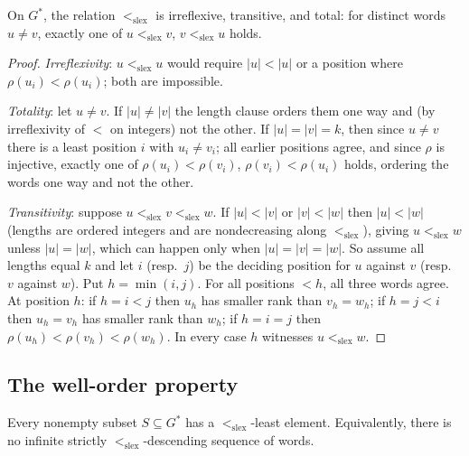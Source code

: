 \begin{proposition}\label{ch02:prop:slex-total}
On $G^{*}$, the relation $<_{\mathrm{slex}}$ is irreflexive, transitive,
and total: for distinct words $u \neq v$, exactly one of
$u <_{\mathrm{slex}} v$, $v <_{\mathrm{slex}} u$ holds.
\end{proposition}

\begin{proof}
\emph{Irreflexivity}: $u <_{\mathrm{slex}} u$ would require $|u| < |u|$ or
a position where $\rho(u_i) < \rho(u_i)$; both are impossible.

\emph{Totality}: let $u \neq v$. If $|u| \neq |v|$ the length clause
orders them one way and (by irreflexivity of $<$ on integers) not the
other. If $|u| = |v| = k$, then since $u \neq v$ there is a least
position $i$ with $u_i \neq v_i$; all earlier positions agree, and since
$\rho$ is injective, exactly one of $\rho(u_i) < \rho(v_i)$,
$\rho(v_i) < \rho(u_i)$ holds, ordering the words one way and not the
other.

\emph{Transitivity}: suppose $u <_{\mathrm{slex}} v <_{\mathrm{slex}} w$.
If $|u| < |v|$ or $|v| < |w|$ then $|u| < |w|$ (lengths are ordered
integers and are nondecreasing along $<_{\mathrm{slex}}$), giving
$u <_{\mathrm{slex}} w$ unless $|u| = |w|$, which can happen only when
$|u| = |v| = |w|$. So assume all lengths equal $k$ and let $i$ (resp.\
$j$) be the deciding position for $u$ against $v$ (resp.\ $v$ against
$w$). Put $h = \min(i, j)$. For all positions $< h$, all three words
agree. At position $h$: if $h = i < j$ then $u_h$ has smaller rank than
$v_h = w_h$; if $h = j < i$ then $u_h = v_h$ has smaller rank than $w_h$;
if $h = i = j$ then $\rho(u_h) < \rho(v_h) < \rho(w_h)$. In every case
$h$ witnesses $u <_{\mathrm{slex}} w$.
\end{proof}

\subsection{The well-order property}

\begin{theorem}\label{ch02:thm:slex-wellorder}
Every nonempty subset $S \subseteq G^{*}$ has a
$<_{\mathrm{slex}}$-least element. Equivalently, there is no infinite
strictly $<_{\mathrm{slex}}$-descending sequence of words.
\end{theorem}

